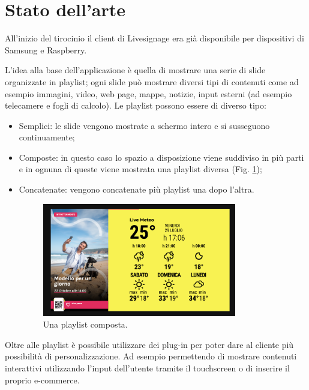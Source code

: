 \section{Stato dell'arte}\label{statoarte}

All'inizio del tirocinio il client di Livesignage era già disponibile per dispositivi di Samsung e Raspberry.  

L'idea alla base dell'applicazione è quella di mostrare una serie di slide organizzate in playlist; ogni slide può mostrare diversi tipi di contenuti come ad esempio immagini, video, web page, mappe, notizie, input esterni (ad esempio telecamere e fogli di calcolo). Le playlist possono essere di diverso tipo:

\begin{itemize}
    \item Semplici: le slide vengono mostrate a schermo intero e si susseguono continuamente;
    \item Composte: in questo caso lo spazio a disposizione viene suddiviso in più parti e in ognuna di queste viene mostrata una playlist diversa (Fig. \ref*{fig:playlist-composta});
    \item Concatenate: vengono concatenate più playlist una dopo l'altra.
    \begin{figure}[!htb]
        \centering
        \includegraphics[width= 0.8\textwidth]{images/Introduzione/playlist-composta.png} 
        \caption{Una playlist composta.} 
        \label{fig:playlist-composta}
    \end{figure}
\end{itemize}


Oltre alle playlist è possibile utilizzare dei plug-in per poter dare al cliente più possibilità di personalizzazione. Ad esempio permettendo di  mostrare contenuti interattivi utilizzando l'input dell'utente tramite il touchscreen o di inserire il proprio e-commerce.

